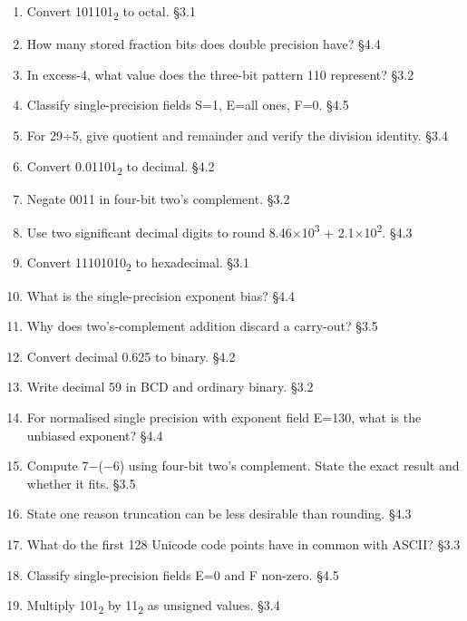 \documentclass[11pt]{article}
\begin{document}
\begin{keepsection}
\begin{enumerate}
\item Convert 101101\textsubscript{2} to octal. \hfill{\small\color{FAUblue}§3.1}
\item How many stored fraction bits does double precision have? \hfill{\small\color{FAUblue}§4.4}
\item In excess-4, what value does the three-bit pattern 110 represent? \hfill{\small\color{FAUblue}§3.2}
\item Classify single-precision fields S=1, E=all ones, F=0. \hfill{\small\color{FAUblue}§4.5}
\item For 29÷5, give quotient and remainder and verify the division identity. \hfill{\small\color{FAUblue}§3.4}
\item Convert 0.01101\textsubscript{2} to decimal. \hfill{\small\color{FAUblue}§4.2}
\item Negate 0011 in four-bit two’s complement. \hfill{\small\color{FAUblue}§3.2}
\item Use two significant decimal digits to round 8.46\ensuremath{\times}10\textsuperscript{3} + 2.1\ensuremath{\times}10\textsuperscript{2}. \hfill{\small\color{FAUblue}§4.3}
\item Convert 11101010\textsubscript{2} to hexadecimal. \hfill{\small\color{FAUblue}§3.1}
\item What is the single-precision exponent bias? \hfill{\small\color{FAUblue}§4.4}
\item Why does two’s-complement addition discard a carry-out? \hfill{\small\color{FAUblue}§3.5}
\item Convert decimal 0.625 to binary. \hfill{\small\color{FAUblue}§4.2}
\item Write decimal 59 in BCD and ordinary binary. \hfill{\small\color{FAUblue}§3.2}
\item For normalised single precision with exponent field E=130, what is the unbiased exponent? \hfill{\small\color{FAUblue}§4.4}
\item Compute 7\ensuremath{-}(\ensuremath{-}6) using four-bit two’s complement. State the exact result and whether it fits. \hfill{\small\color{FAUblue}§3.5}
\item State one reason truncation can be less desirable than rounding. \hfill{\small\color{FAUblue}§4.3}
\item What do the first 128 Unicode code points have in common with ASCII? \hfill{\small\color{FAUblue}§3.3}
\item Classify single-precision fields E=0 and F non-zero. \hfill{\small\color{FAUblue}§4.5}
\item Multiply 101\textsubscript{2} by 11\textsubscript{2} as unsigned values. \hfill{\small\color{FAUblue}§3.4}

\end{enumerate}
\end{keepsection}
\end{document}
